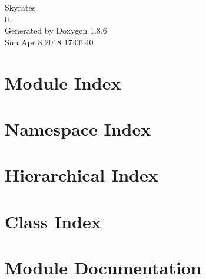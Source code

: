 \documentclass[twoside]{book}
\newcommand{\clearemptydoublepage}{%
  \newpage{\pagestyle{empty}\cleardoublepage}%
}
\begin{document}
\hypersetup{pageanchor=false}
\begin{titlepage}
\vspace*{7cm}
\begin{center}%
{\Large Skyrates \\[1ex]\large 0.. }\\
\vspace*{1cm}
{\large Generated by Doxygen 1.8.6}\\
\vspace*{0.5cm}
{\small Sun Apr 8 2018 17:06:40}\\
\end{center}
\end{titlepage}
\clearemptydoublepage
\tableofcontents
\clearemptydoublepage
{}
\hypersetup{pageanchor=true}

\chapter{Module Index}

\chapter{Namespace Index}

\chapter{Hierarchical Index}

\chapter{Class Index}

\chapter{Module Documentation}




\end{document}

